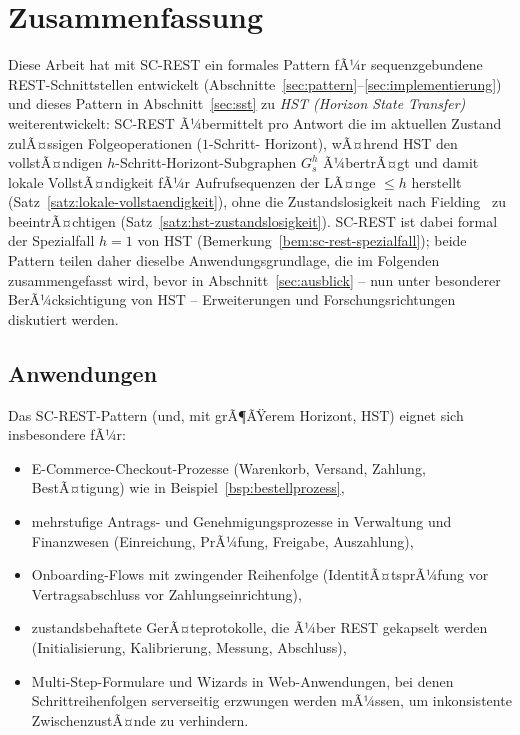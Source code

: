 ﻿\documentclass[a4paper,12pt]{article}
\theoremstyle{definition}
\begin{document}
\section{Zusammenfassung}

Diese Arbeit hat mit SC-REST ein formales Pattern fÃ¼r sequenzgebundene REST-Schnittstellen
entwickelt (Abschnitte~\ref{sec:pattern}--\ref{sec:implementierung}) und dieses Pattern in
Abschnitt~\ref{sec:sst} zu \emph{HST (Horizon State Transfer)} weiterentwickelt: SC-REST
Ã¼bermittelt pro Antwort die im aktuellen Zustand zulÃ¤ssigen Folgeoperationen ($1$-Schritt-
Horizont), wÃ¤hrend HST den vollstÃ¤ndigen $h$-Schritt-Horizont-Subgraphen $G_s^h$
Ã¼bertrÃ¤gt und damit lokale VollstÃ¤ndigkeit fÃ¼r Aufrufsequenzen der LÃ¤nge $\le h$
herstellt (Satz~\ref{satz:lokale-vollstaendigkeit}), ohne die Zustandslosigkeit nach
Fielding~\cite{fielding2000} zu beeintrÃ¤chtigen (Satz~\ref{satz:hst-zustandslosigkeit}).
SC-REST ist dabei formal der Spezialfall $h=1$ von HST
(Bemerkung~\ref{bem:sc-rest-spezialfall}); beide Pattern teilen daher dieselbe
Anwendungsgrundlage, die im Folgenden zusammengefasst wird, bevor in
Abschnitt~\ref{sec:ausblick} -- nun unter besonderer BerÃ¼cksichtigung von HST --
Erweiterungen und Forschungsrichtungen diskutiert werden.

\subsection{Anwendungen}

Das SC-REST-Pattern (und, mit grÃ¶ÃŸerem Horizont, HST) eignet sich insbesondere fÃ¼r:
\begin{itemize}
	\item E-Commerce-Checkout-Prozesse (Warenkorb, Versand, Zahlung, BestÃ¤tigung) wie in
	      Beispiel~\ref{bsp:bestellprozess},
	\item mehrstufige Antrags- und Genehmigungsprozesse in Verwaltung und Finanzwesen
	      (Einreichung, PrÃ¼fung, Freigabe, Auszahlung),
	\item Onboarding-Flows mit zwingender Reihenfolge (IdentitÃ¤tsprÃ¼fung vor
	      Vertragsabschluss vor Zahlungseinrichtung),
	\item zustandsbehaftete GerÃ¤teprotokolle, die Ã¼ber REST gekapselt werden
	      (Initialisierung, Kalibrierung, Messung, Abschluss),
	\item Multi-Step-Formulare und Wizards in Web-Anwendungen, bei denen
	      Schrittreihenfolgen serverseitig erzwungen werden mÃ¼ssen, um inkonsistente
	      ZwischenzustÃ¤nde zu verhindern.
\end{itemize}
\end{document}
